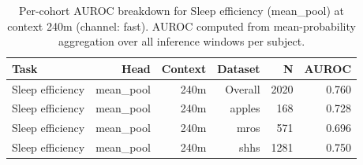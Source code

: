 \begin{table}[ht]
\centering
\caption{Per-cohort AUROC breakdown for Sleep efficiency (mean_pool) at context 240m (channel: fast). AUROC computed from mean-probability aggregation over all inference windows per subject.}
\label{tab:cohort_sleep_efficiency_binary_mean_pool_fast}
\begin{tabular}{lrrrrr}
\toprule
Task & Head & Context & Dataset & N & AUROC \\
\midrule
Sleep efficiency & mean_pool & 240m & Overall & 2020 & 0.760 \\
Sleep efficiency & mean_pool & 240m & apples & 168 & 0.728 \\
Sleep efficiency & mean_pool & 240m & mros & 571 & 0.696 \\
Sleep efficiency & mean_pool & 240m & shhs & 1281 & 0.750 \\
\bottomrule
\end{tabular}
\end{table}